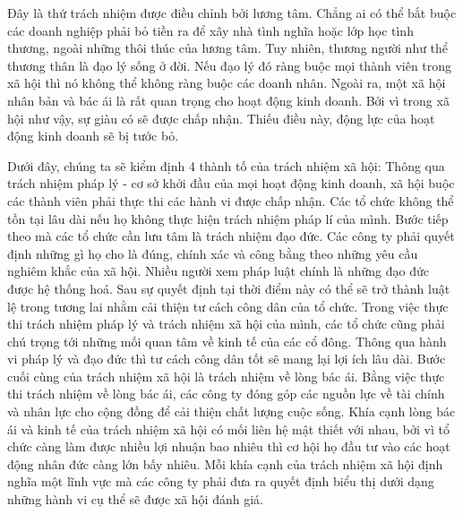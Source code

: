 \documentclass{article}
\begin{document}
\begin{itemize}
            \qquad Đây là thứ trách nhiệm được điều chỉnh bởi lương tâm. Chẳng ai có thể bắt buộc các doanh nghiệp phải bỏ tiền ra để xây nhà tình nghĩa hoặc lớp học tình thương, ngoài những thôi thúc của lương tâm. Tuy nhiên, thương người như thể thương thân là đạo lý sống ở đời. Nếu đạo lý đó ràng buộc mọi thành viên trong xã hội thì nó không thể không ràng buộc các doanh nhân. Ngoài ra, một xã hội nhân bản và bác ái là rất quan trọng cho hoạt động kinh doanh. Bởi vì trong xã hội như vậy, sự giàu có sẽ được chấp nhận. Thiếu điều này, động lực của hoạt động kinh doanh sẽ bị tước bỏ.

        \end{itemize}

        \vspace{0.2cm}
        Dưới đây, chúng ta sẽ kiểm định 4 thành tố của trách nhiệm xã hội: Thông qua trách nhiệm pháp lý - cơ sở khởi đầu của mọi hoạt động kinh doanh, xã hội buộc các thành viên phải thực thi các hành vi được chấp nhận. Các tổ chức không thể tồn tại lâu dài nếu họ không thực hiện trách nhiệm pháp lí của mình. Bước tiếp theo mà các tổ chức cần lưu tâm là trách nhiệm đạo đức. Các công ty phải quyết định những gì họ cho là đúng, chính xác và công bằng theo những yêu cầu nghiêm khắc của xã hội. Nhiều người xem pháp luật chính là những đạo đức được hệ thống hoá. Sau sự quyết định tại thời điểm này có thể sẽ trở thành luật lệ trong tương lai nhằm cải thiện tư cách công dân của tổ chức. Trong việc thực thi trách nhiệm pháp lý và trách nhiệm xã hội của mình, các tổ chức cũng phải chú trọng tới những mối quan tâm về kinh tế của các cổ đông. Thông qua hành vi pháp lý và đạo đức thì tư cách công dân tốt sẽ mang lại lợi ích lâu dài. Bước cuối cùng của trách nhiệm xã hội là trách nhiệm về lòng bác ái. Bằng việc thực thi trách nhiệm về lòng bác ái, các công ty đóng góp các nguồn lực về tài chính và nhân lực cho cộng đồng để cải thiện chất lượng cuộc sống. Khía cạnh lòng bác ái và kinh tế của trách nhiệm xã hội có mối liên hệ mật thiết với nhau, bởi vì tổ chức càng làm được nhiều lợi nhuận bao nhiêu thì cơ hội họ đầu tư vào các hoạt động nhân đức càng lớn bấy nhiêu. Mỗi khía cạnh của trách nhiệm xã hội định nghĩa một lĩnh vực mà các công ty phải đưa ra quyết định biểu thị dưới dạng những hành vi cụ thể sẽ được xã hội đánh giá.
\end{document}
